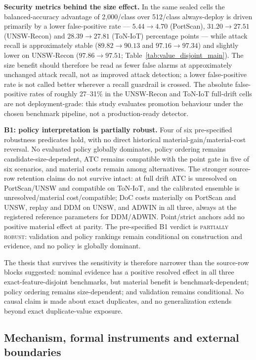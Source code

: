 \documentclass[a4paper,fleqn]{cas-sc}
\begin{document}
\textbf{Security metrics behind the size effect.} In the same sealed cells the balanced-accuracy advantage of 2{,}000/class over 512/class always-deploy is driven primarily by a lower false-positive rate --- $5.44\to4.70$ (PortScan), $31.20\to27.51$ (UNSW-Recon) and $28.39\to27.81$ (ToN-IoT) percentage points --- while attack recall is approximately stable ($89.82\to90.13$ and $97.16\to97.34$) and slightly lower on UNSW-Recon ($97.86\to97.51$; Table~\ref{tab:value_disjoint_main}). The size benefit should therefore be read as fewer false alarms at approximately unchanged attack recall, not as improved attack detection; a lower false-positive rate is not called better wherever a recall guardrail is crossed. The absolute false-positive rates of roughly 27--31\% in the UNSW-Recon and ToN-IoT full-drift cells are not deployment-grade: this study evaluates promotion behaviour under the chosen benchmark pipeline, not a production-ready detector.

\textbf{B1: policy interpretation is partially robust.} Four of six pre-specified robustness predicates hold, with no direct historical material-gain/material-cost reversal. No evaluated policy globally dominates, policy ordering remains candidate-size-dependent, ATC remains compatible with the point gate in five of six scenarios, and material costs remain among alternatives. The stronger source-row retention claims do not survive intact: at full drift ATC is unresolved on PortScan/UNSW and compatible on ToN-IoT, and the calibrated ensemble is unresolved/material cost/compatible; DoC costs materially on PortScan and UNSW, replay and DDM on UNSW, and ADWIN in all three, always at the registered reference parameters for DDM/ADWIN. Point/strict anchors add no positive material effect at parity. The pre-specified B1 verdict is \textsc{partially robust}: validation and policy rankings remain conditional on construction and evidence, and no policy is globally dominant.

The thesis that survives the sensitivity is therefore narrower than the source-row blocks suggested: nominal evidence has a positive resolved effect in all three exact-feature-disjoint benchmarks, but material benefit is benchmark-dependent; policy ordering remains size-dependent; and validation remains conditional. No causal claim is made about exact duplicates, and no generalization extends beyond exact duplicate-value exposure.

\subsection{Mechanism, formal instruments and external boundaries}
\label{sec:v2}
\label{sec:risk}
\label{sec:boundaries}
\end{document}
